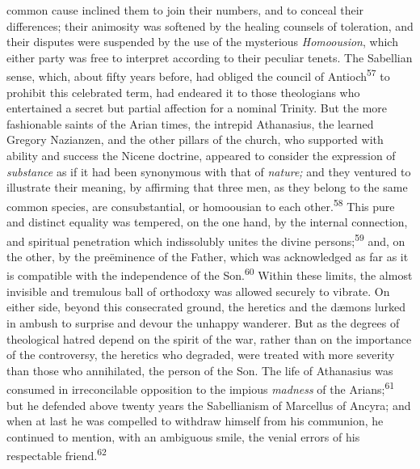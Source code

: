 common cause inclined them to join their numbers, and to conceal
their differences; their animosity was softened by the healing
counsels of toleration, and their disputes were suspended by the
use of the mysterious \textit{Homoousion}, which either party was free
to interpret according to their peculiar tenets. The Sabellian
sense, which, about fifty years before, had obliged the council
of Antioch\textsuperscript{57} to prohibit this celebrated term, had endeared it
to those theologians who entertained a secret but partial
affection for a nominal Trinity. But the more fashionable saints
of the Arian times, the intrepid Athanasius, the learned Gregory
Nazianzen, and the other pillars of the church, who supported
with ability and success the Nicene doctrine, appeared to
consider the expression of \textit{substance} as if it had been
synonymous with that of \textit{nature;} and they ventured to illustrate
their meaning, by affirming that three men, as they belong to the
same common species, are consubstantial, or homoousian to each
other.\textsuperscript{58} This pure and distinct equality was tempered, on the
one hand, by the internal connection, and spiritual penetration
which indissolubly unites the divine persons;\textsuperscript{59} and, on the
other, by the preëminence of the Father, which was acknowledged
as far as it is compatible with the independence of the Son.\textsuperscript{60}
Within these limits, the almost invisible and tremulous ball of
orthodoxy was allowed securely to vibrate. On either side, beyond
this consecrated ground, the heretics and the dæmons lurked in
ambush to surprise and devour the unhappy wanderer. But as the
degrees of theological hatred depend on the spirit of the war,
rather than on the importance of the controversy, the heretics
who degraded, were treated with more severity than those who
annihilated, the person of the Son. The life of Athanasius was
consumed in irreconcilable opposition to the impious \textit{madness} of
the Arians;\textsuperscript{61} but he defended above twenty years the
Sabellianism of Marcellus of Ancyra; and when at last he was
compelled to withdraw himself from his communion, he continued to
mention, with an ambiguous smile, the venial errors of his
respectable friend.\textsuperscript{62}


